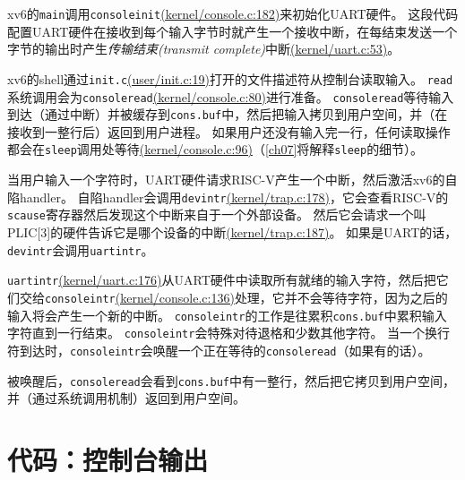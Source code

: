 xv6的\texttt{main}调用\texttt{consoleinit}\href{https://github.com/mit-pdos/xv6-riscv/blob/risc/kernel/console.c#L182}{(kernel/console.c:182)}来初始化UART硬件。
这段代码配置UART硬件在接收到每个输入字节时就产生一个接收中断，在每结束发送一个字节的输出时产生\emph{传输结束(transmit complete)}中断\href{https://github.com/mit-pdos/xv6-riscv/blob/risc/kernel/uart.c#L53}{(kernel/uart.c:53)}。

xv6的shell通过\texttt{init.c}\href{https://github.com/mit-pdos/xv6-riscv/blob/risc/user/init.c#L19}{(user/init.c:19)}打开的文件描述符从控制台读取输入。
\texttt{read}系统调用会为\texttt{consoleread}\href{https://github.com/mit-pdos/xv6-riscv/blob/risc/kernel/console.c#L80}{(kernel/console.c:80)}进行准备。
\texttt{consoleread}等待输入到达（通过中断）并被缓存到\texttt{cons.buf}中，然后把输入拷贝到用户空间，并（在接收到一整行后）返回到用户进程。
如果用户还没有输入完一行，任何读取操作都会在\texttt{sleep}调用处等待\href{https://github.com/mit-pdos/xv6-riscv/blob/risc/kernel/console.c#L96}{(kernel/console.c:96)}（\autoref{ch07}将解释\texttt{sleep}的细节）。

当用户输入一个字符时，UART硬件请求RISC-V产生一个中断，然后激活xv6的自陷handler。
自陷handler会调用\texttt{devintr}\href{https://github.com/mit-pdos/xv6-riscv/blob/risc/kernel/trap.c#L178}{(kernel/trap.c:178)}，它会查看RISC-V的\texttt{scause}寄存器然后发现这个中断来自于一个外部设备。
然后它会请求一个叫PLIC[3]的硬件告诉它是哪个设备的中断\href{https://github.com/mit-pdos/xv6-riscv/blob/risc/kernel/trap.c#L187}{(kernel/trap.c:187)}。
如果是UART的话，\texttt{devintr}会调用\texttt{uartintr}。

\texttt{uartintr}\href{https://github.com/mit-pdos/xv6-riscv/blob/risc/kernel/uart.c#L176}{(kernel/uart.c:176)}从UART硬件中读取所有就绪的输入字符，然后把它们交给\texttt{consoleintr}\href{https://github.com/mit-pdos/xv6-riscv/blob/risc/kernel/console.c#L136}{(kernel/console.c:136)}处理，它并不会等待字符，因为之后的输入将会产生一个新的中断。
\texttt{consoleintr}的工作是往累积\texttt{cons.buf}中累积输入字符直到一行结束。
\texttt{consoleintr}会特殊对待退格和少数其他字符。
当一个换行符到达时，\texttt{consoleintr}会唤醒一个正在等待的\texttt{consoleread}（如果有的话）。

被唤醒后，\texttt{consoleread}会看到\texttt{cons.buf}中有一整行，然后把它拷贝到用户空间，并（通过系统调用机制）返回到用户空间。

\section{代码：控制台输出}

